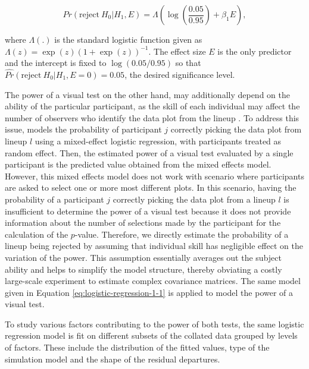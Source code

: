 \documentclass[]{interact}
\theoremstyle{plain}%
\theoremstyle{definition}
\theoremstyle{remark}
\begin{document}
\vspace{-\baselineskip}

\begin{equation} \label{eq:logistic-regression-1-1}
Pr(\text{reject}~H_0|H_1,E) = \Lambda\left(\log\left(\frac{0.05}{0.95}\right) + \beta_1 E\right),
\end{equation}

\noindent where \(\Lambda(.)\) is the standard logistic function given
as \(\Lambda(z) = \exp(z)(1+\exp(z))^{-1}\). The effect size \(E\) is
the only predictor and the intercept is fixed to \(\log(0.05/0.95)\) so
that \(\hat{Pr}(\text{reject}~H_0|H_1,E = 0) = 0.05\), the desired
significance level.

The power of a visual test on the other hand, may additionally depend on
the ability of the particular participant, as the skill of each
individual may affect the number of observers who identify the data plot
from the lineup \citep{majumder2013validation}. To address this issue,
\citet{majumder2013validation} models the probability of participant
\(j\) correctly picking the data plot from lineup \(l\) using a
mixed-effect logistic regression, with participants treated as random
effect. Then, the estimated power of a visual test evaluated by a single
participant is the predicted value obtained from the mixed effects
model. However, this mixed effects model does not work with scenario
where participants are asked to select one or more most different plots.
In this scenario, having the probability of a participant \(j\)
correctly picking the data plot from a lineup \(l\) is insufficient to
determine the power of a visual test because it does not provide
information about the number of selections made by the participant for
the calculation of the \(p\)-value. Therefore, we directly estimate the
probability of a lineup being rejected by assuming that individual skill
has negligible effect on the variation of the power. This assumption
essentially averages out the subject ability and helps to simplify the
model structure, thereby obviating a costly large-scale experiment to
estimate complex covariance matrices. The same model given in Equation
\ref{eq:logistic-regression-1-1} is applied to model the power of a
visual test.

To study various factors contributing to the power of both tests, the
same logistic regression model is fit on different subsets of the
collated data grouped by levels of factors. These include the
distribution of the fitted values, type of the simulation model and the
shape of the residual departures.
\end{document}
